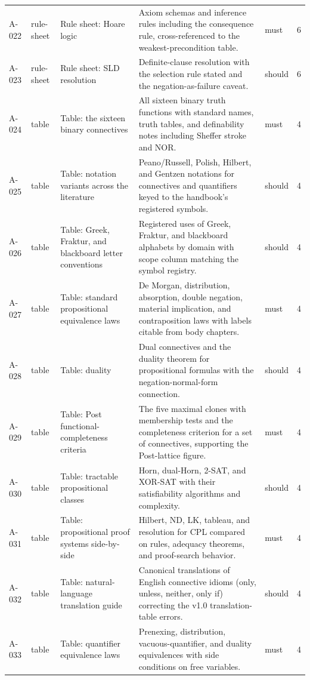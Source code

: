 \begin{longtable}{@{}p{0.45in}p{0.78in}p{2.02in}p{2.6in}p{0.42in}p{0.16in}@{}}
A-022 & rule-sheet & Rule sheet: Hoare logic & Axiom schemas and inference rules including the consequence rule, cross-referenced to the weakest-precondition table. & must & 6 \\
A-023 & rule-sheet & Rule sheet: SLD resolution & Definite-clause resolution with the selection rule stated and the negation-as-failure caveat. & should & 6 \\
A-024 & table & Table: the sixteen binary connectives & All sixteen binary truth functions with standard names, truth tables, and definability notes including Sheffer stroke and NOR. & must & 4 \\
A-025 & table & Table: notation variants across the literature & Peano/Russell, Polish, Hilbert, and Gentzen notations for connectives and quantifiers keyed to the handbook's registered symbols. & should & 4 \\
A-026 & table & Table: Greek, Fraktur, and blackboard letter conventions & Registered uses of Greek, Fraktur, and blackboard alphabets by domain with scope column matching the symbol registry. & should & 4 \\
A-027 & table & Table: standard propositional equivalence laws & De Morgan, distribution, absorption, double negation, material implication, and contraposition laws with labels citable from body chapters. & must & 4 \\
A-028 & table & Table: duality & Dual connectives and the duality theorem for propositional formulas with the negation-normal-form connection. & should & 4 \\
A-029 & table & Table: Post functional-completeness criteria & The five maximal clones with membership tests and the completeness criterion for a set of connectives, supporting the Post-lattice figure. & must & 4 \\
A-030 & table & Table: tractable propositional classes & Horn, dual-Horn, 2-SAT, and XOR-SAT with their satisfiability algorithms and complexity. & should & 4 \\
A-031 & table & Table: propositional proof systems side-by-side & Hilbert, ND, LK, tableau, and resolution for CPL compared on rules, adequacy theorems, and proof-search behavior. & must & 4 \\
A-032 & table & Table: natural-language translation guide & Canonical translations of English connective idioms (only, unless, neither, only if) correcting the v1.0 translation-table errors. & should & 4 \\
A-033 & table & Table: quantifier equivalence laws & Prenexing, distribution, vacuous-quantifier, and duality equivalences with side conditions on free variables. & must & 4 \\

\end{longtable}
